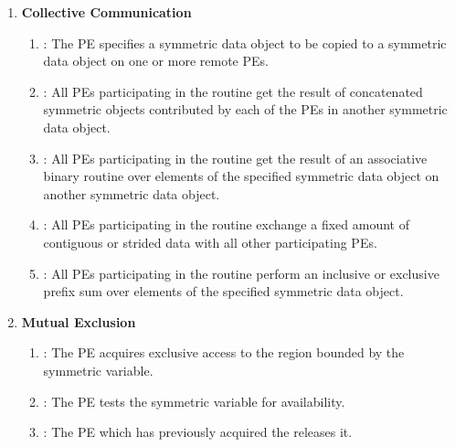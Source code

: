 \begin{enumerate}
\item \textbf{Collective Communication}
\begin{enumerate}
  \item {}: The  \ac{PE} specifies a symmetric data
      object to be copied to a symmetric data object on one or more remote
      \acp{PE}.
  \item {}: All \acp{PE} participating in the routine get the result
      of concatenated symmetric objects contributed by each of the \acp{PE} in
      another symmetric data object.
  \item {}: All \acp{PE} participating in the routine get the result
      of an associative binary routine over elements of the specified symmetric
      data object on another symmetric data object.
  \item {}: All \acp{PE} participating in the routine exchange
      a fixed amount of contiguous or strided data with all other participating
      \acp{PE}.
  \item {}: All \acp{PE} participating in the routine perform an
      inclusive or exclusive prefix sum over elements of the specified
      symmetric data object.
\end{enumerate}

\item \textbf{Mutual Exclusion}
\begin{enumerate}
  \item {}: The \ac{PE} acquires exclusive access to the region
      bounded by the symmetric  variable.
  \item {}: The \ac{PE} tests the symmetric  variable
      for availability.
  \item {}: The \ac{PE} which has previously acquired the
       releases it.
\end{enumerate}

\end{enumerate}
